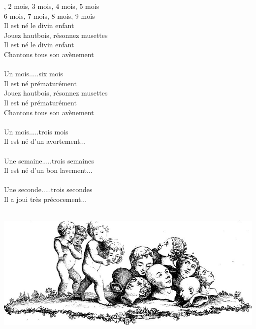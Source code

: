 
, 2 mois, 3 mois, 4 mois, 5 mois
\\6 mois, 7 mois, 8 mois, 9 mois
\\Il est né le divin enfant
\\Jouez hautbois, résonnez musettes
\\Il est né le divin enfant
\\Chantons tous son avènement
\\\\Un mois.....six mois
\\Il est né prématurément
\\Jouez hautbois, résonnez musettes
\\Il est né prématurément
\\Chantons tous son avènement
\\\\Un mois.....trois mois
\\Il est né d'un avortement...
\\\\Une semaine.....trois semaines
\\Il est né d'un bon lavement...
\\\\Une seconde.....trois secondes
\\Il a joui très précocement...
\\\\
\bigskip
\begin{center}
   \includegraphics[width=1\textwidth]{images/brev4.png}
 \end{center}


\breakpage